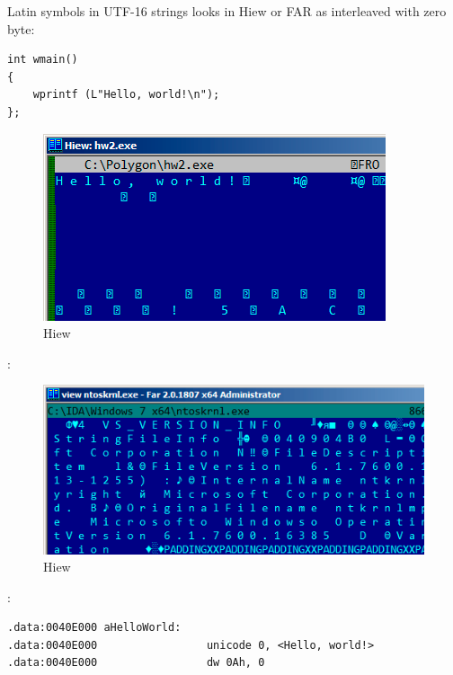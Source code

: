 {Latin symbols in UTF-16 strings looks in Hiew or FAR as interleaved with zero byte}:

\begin{lstlisting}
int wmain()
{
	wprintf (L"Hello, world!\n");
};
\end{lstlisting}

\begin{figure}[H]
\centering
\includegraphics[scale=0.66]{other/strings/UTF16-string.png}
\caption{Hiew}
\end{figure}

:

\begin{figure}[H]
\centering
\includegraphics[scale=0.66]{other/strings/ntoskrnl_UTF16.png}
\caption{Hiew}
\end{figure}

:

\begin{lstlisting}
.data:0040E000 aHelloWorld:
.data:0040E000                 unicode 0, <Hello, world!>
.data:0040E000                 dw 0Ah, 0
\end{lstlisting}

